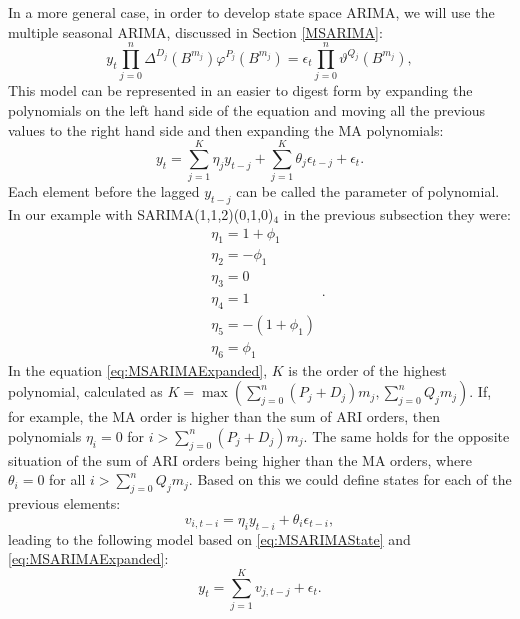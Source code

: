 \documentclass[]{book}
\theoremstyle{definition}
\theoremstyle{definition}
\theoremstyle{definition}
\theoremstyle{definition}
\theoremstyle{remark}
\begin{document}
In a more general case, in order to develop state space ARIMA, we will use the multiple seasonal ARIMA, discussed in Section \ref{MSARIMA}:
\begin{equation*}
  y_t \prod_{j=0}^n \Delta^{D_j} (B^{m_j}) \varphi^{P_j}(B^{m_j}) = \epsilon_t \prod_{j=0}^n \vartheta^{Q_j}(B^{m_j}) ,
\end{equation*}
This model can be represented in an easier to digest form by expanding the polynomials on the left hand side of the equation and moving all the previous values to the right hand side and then expanding the MA polynomials:
\begin{equation}
  y_t = \sum_{j=1}^K \eta_j y_{t-j} + \sum_{j=1}^K \theta_j \epsilon_{t-j} + \epsilon_t .
  \label{eq:MSARIMAExpanded}
\end{equation}
Each element before the lagged \(y_{t-j}\) can be called the parameter of polynomial. In our example with SARIMA(1,1,2)(0,1,0)\(_4\) in the previous subsection they were:
\begin{equation*}
    \begin{aligned}
    & \eta_1 = 1+\phi_1 \\
    & \eta_2 = -\phi_1 \\
    & \eta_3 = 0 \\
    & \eta_4 = 1 \\
    & \eta_5 = -(1+\phi_1) \\
    & \eta_6 = \phi_1
    \end{aligned} .
\end{equation*}
In the equation \eqref{eq:MSARIMAExpanded}, \(K\) is the order of the highest polynomial, calculated as \(K=\max\left(\sum_{j=0}^n (P_j + D_j)m_j, \sum_{j=0}^n Q_j m_j\right)\). If, for example, the MA order is higher than the sum of ARI orders, then polynomials \(\eta_i=0\) for \(i>\sum_{j=0}^n (P_j + D_j)m_j\). The same holds for the opposite situation of the sum of ARI orders being higher than the MA orders, where \(\theta_i=0\) for all \(i>\sum_{j=0}^n Q_j m_j\). Based on this we could define states for each of the previous elements:
\begin{equation}
  v_{i,t-i} = \eta_i y_{t-i} + \theta_i \epsilon_{t-i},
  \label{eq:MSARIMAState}
\end{equation}
leading to the following model based on \eqref{eq:MSARIMAState} and \eqref{eq:MSARIMAExpanded}:
\begin{equation}
  y_t = \sum_{j=1}^K v_{j,t-j} + \epsilon_t .
  \label{eq:MSARIMAMeasurement01}
\end{equation}
\end{document}
